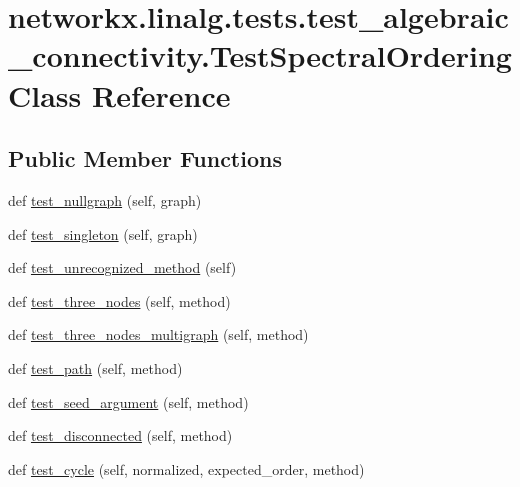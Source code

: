 \hypertarget{classnetworkx_1_1linalg_1_1tests_1_1test__algebraic__connectivity_1_1TestSpectralOrdering}{}\section{networkx.\+linalg.\+tests.\+test\+\_\+algebraic\+\_\+connectivity.\+Test\+Spectral\+Ordering Class Reference}
\label{classnetworkx_1_1linalg_1_1tests_1_1test__algebraic__connectivity_1_1TestSpectralOrdering}
\subsection*{Public Member Functions}
\begin{DoxyCompactItemize}
\item 
def \hyperlink{classnetworkx_1_1linalg_1_1tests_1_1test__algebraic__connectivity_1_1TestSpectralOrdering_a59a9905886cf31f3dde0826dc659c882}{test\+\_\+nullgraph} (self, graph)
\item 
def \hyperlink{classnetworkx_1_1linalg_1_1tests_1_1test__algebraic__connectivity_1_1TestSpectralOrdering_a5ce255f36ad1616e8f75946c86ab053e}{test\+\_\+singleton} (self, graph)
\item 
def \hyperlink{classnetworkx_1_1linalg_1_1tests_1_1test__algebraic__connectivity_1_1TestSpectralOrdering_a3b366720e44db8a13138d1f7810e8319}{test\+\_\+unrecognized\+\_\+method} (self)
\item 
def \hyperlink{classnetworkx_1_1linalg_1_1tests_1_1test__algebraic__connectivity_1_1TestSpectralOrdering_acb8d364721e023441f44e38091859a1d}{test\+\_\+three\+\_\+nodes} (self, method)
\item 
def \hyperlink{classnetworkx_1_1linalg_1_1tests_1_1test__algebraic__connectivity_1_1TestSpectralOrdering_afa35ad6f2acc8db73b4f19de1bb57bda}{test\+\_\+three\+\_\+nodes\+\_\+multigraph} (self, method)
\item 
def \hyperlink{classnetworkx_1_1linalg_1_1tests_1_1test__algebraic__connectivity_1_1TestSpectralOrdering_a33445dc086b663dcc8641b5c2047f96c}{test\+\_\+path} (self, method)
\item 
def \hyperlink{classnetworkx_1_1linalg_1_1tests_1_1test__algebraic__connectivity_1_1TestSpectralOrdering_ae7549e0a28ec60c09ef42901bd3e44f0}{test\+\_\+seed\+\_\+argument} (self, method)
\item 
def \hyperlink{classnetworkx_1_1linalg_1_1tests_1_1test__algebraic__connectivity_1_1TestSpectralOrdering_ac8a987eaed7368a76b5924dc14ab96c9}{test\+\_\+disconnected} (self, method)
\item 
def \hyperlink{classnetworkx_1_1linalg_1_1tests_1_1test__algebraic__connectivity_1_1TestSpectralOrdering_a4745dd4cfdfb8fb57be95769c8e9c30c}{test\+\_\+cycle} (self, normalized, expected\+\_\+order, method)
\end{DoxyCompactItemize}


